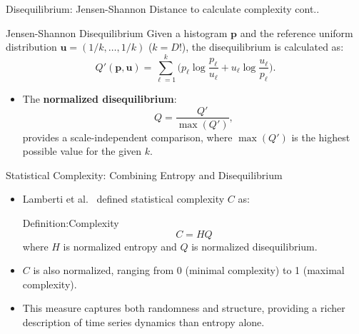 \documentclass{beamer}
\begin{document}
\begin{frame}{Disequilibrium: Jensen-Shannon Distance to calculate complexity cont..}
	\begin{block}{Jensen-Shannon Disequilibrium}
		Given a histogram $\mathbf{p}$ and the reference uniform distribution $\mathbf{u} = (1/k, \ldots, 1/k)$ ($k = D!$), the disequilibrium is calculated as:
		\[
		Q'(\mathbf{p},\mathbf{u}) = \sum_{\ell=1}^k \Big( p_\ell \log\frac{p_\ell}{u_\ell} + u_\ell \log\frac{u_\ell}{p_\ell} \Big).
		\]
	\end{block}
	\begin{itemize}
		\item The \textbf{normalized disequilibrium}:
		\[
		Q = \frac{Q'}{\max(Q')},
		\]
		provides a scale-independent comparison, where $\max(Q')$ is the highest possible value for the given $k$.
	\end{itemize}
	
\end{frame}


\begin{frame}{Statistical Complexity: Combining Entropy and Disequilibrium}
	\begin{itemize}
		\item Lamberti et al.~\cite{lamberti2004intensive} defined \alert{statistical complexity} $C$ as:
		\begin{block}{Definition:Complexity}
			\[
			C = H Q
			\]
			where $H$ is normalized entropy and $Q$ is normalized disequilibrium.
		\end{block}
		\item $C$ is also normalized, ranging from 0 (minimal complexity) to 1 (maximal complexity).
		\item This measure captures both randomness and structure, providing a richer description of time series dynamics than entropy alone.
	\end{itemize}
\end{frame}


	
\end{document}
